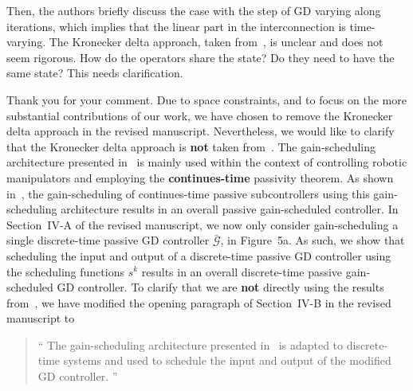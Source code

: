 \begin{rebuttal}[pending]
    {%
        Then, the authors briefly discuss the case with the step of GD varying along iterations, which implies that the linear part in the interconnection is time-varying. The Kronecker delta approach, taken from~\cite{Damaren_spr_gain_scheduling_1996}, is unclear and does not seem rigorous. How do the operators share the state? Do they need to have the same state? This needs clarification. 
    }%
    {%
        Thank you for your comment. Due to space constraints, and to focus on the more substantial contributions of our work, we have chosen to remove the Kronecker delta approach in the revised manuscript. Nevertheless, we would like to clarify that the Kronecker delta approach is \textbf{not} taken from~\cite{Damaren_spr_gain_scheduling_1996}. The gain-scheduling architecture presented in~\cite{Damaren_spr_gain_scheduling_1996} is mainly used within the context of controlling robotic manipulators and employing the \textbf{continues-time} passivity theorem. As shown in~\cite{Damaren_spr_gain_scheduling_1996}, the gain-scheduling of continues-time passive subcontrollers using this gain-scheduling architecture results in an overall passive gain-scheduled controller. In \mbox{Section~IV-A} of the revised manuscript, we now only consider gain-scheduling a single discrete-time passive GD controller \(\bar{\bm{\mathcal{G}}}\), in Figure~5a. As such, we show that scheduling the input and output of a discrete-time passive GD controller using the scheduling functions \(s^k\) results in an overall discrete-time passive gain-scheduled GD controller. To clarify that we are \textbf{not} directly using the results from~\cite{Damaren_spr_gain_scheduling_1996}, we have modified the opening paragraph of Section~IV-B in the revised manuscript to
        \begin{quote}\enquote{%
            The gain-scheduling architecture presented in~\cite{Damaren_spr_gain_scheduling_1996} is adapted to discrete-time systems and used to schedule the input and output of the modified GD controller.%
            }%
        \end{quote}
    }%
\end{rebuttal}
